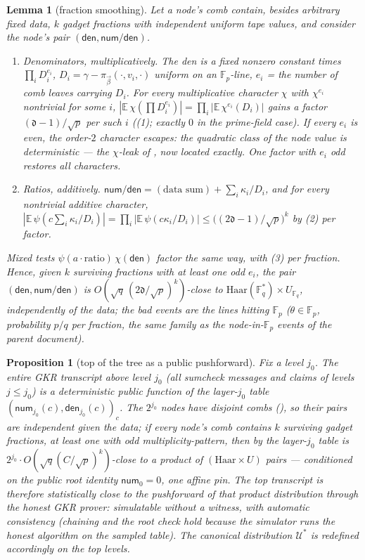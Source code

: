 \documentclass{article}
\newcommand{\Fp}{\mathbb{F}_p}
\newcommand{\Fq}{\mathbb{F}_q}
\newcommand{\extdeg}{\mathfrak{d}}
\newcommand{\num}{\mathsf{num}}
\newcommand{\den}{\mathsf{den}}
\newtheorem{lemma}[theorem]{Lemma}
\newtheorem{proposition}[theorem]{Proposition}
\theoremstyle{definition}
\begin{document}
\begin{lemma}[fraction smoothing]\label{lem:mult}
Let a node's comb contain, besides arbitrary fixed data, $k$ gadget fractions with independent uniform tape values, and consider the node's pair $(\den, \num/\den)$.
\begin{enumerate}
    \item \emph{Denominators, multiplicatively.} The den is a fixed nonzero constant times $\prod_i D_i^{e_i}$, $D_i = \gamma - \pi_{\vec\beta}(\cdot, v_i, \cdot)$ uniform on an $\Fp$-line, $e_i$ = the number of comb leaves carrying $D_i$. For every multiplicative character $\chi$ with $\chi^{e_i}$ nontrivial for some $i$, $|\mathbb{E}\,\chi(\prod D_i^{e_i})| = \prod_i |\mathbb{E}\,\chi^{e_i}(D_i)|$ gains a factor $(\extdeg-1)/\sqrt p$ per such $i$ ((1); exactly $0$ in the prime-field case). If \emph{every} $e_i$ is even, the order-$2$ character escapes: the quadratic class of the node value is deterministic --- the $\chi$-leak of , now located exactly. One factor with $e_i$ odd restores all characters.
    \item \emph{Ratios, additively.} $\num/\den = (\text{data sum}) + \sum_i \kappa_i / D_i$, and for every nontrivial additive character, $|\mathbb{E}\, \psi(c \sum_i \kappa_i/D_i)| = \prod_i |\mathbb{E}\,\psi(c\kappa_i/D_i)| \leq \big((2\extdeg-1)/\sqrt{p}\big)^{k}$ by (2) per factor.
\end{enumerate}
Mixed tests $\psi(a \cdot \mathrm{ratio})\,\chi(\den)$ factor the same way, with (3) per fraction. Hence, given $k$ surviving fractions with at least one odd $e_i$, the pair $(\den, \num/\den)$ is $O(\sqrt{q}\,(2\extdeg/\sqrt{p})^{k})$-close to $\mathrm{Haar}(\Fq^*) \times U_{\Fq}$, independently of the data; the bad events are the lines hitting $\Fp$ ($\theta \in \Fp$, probability $p/q$ per fraction, the same family as the node-in-$\Fp$ events of the parent document).
\end{lemma}

\begin{proposition}[top of the tree as a public pushforward]\label{prop:gkr-top}
Fix a level $j_0$. The entire GKR transcript above level $j_0$ (all sumcheck messages and claims of levels $j \leq j_0$) is a deterministic public function of the layer-$j_0$ table $(\num_{j_0}(c), \den_{j_0}(c))_{c}$. The $2^{j_0}$ nodes have \emph{disjoint} combs (), so their pairs are independent given the data; if every node's comb contains $k$ surviving gadget fractions, at least one with odd multiplicity-pattern, then by  the layer-$j_0$ table is $2^{j_0} \cdot O(\sqrt{q}(C/\sqrt p)^k)$-close to a product of $(\mathrm{Haar} \times U)$ pairs --- conditioned on the public root identity $\num_0 = 0$, one affine pin. The top transcript is therefore statistically close to the pushforward of that product distribution through the honest GKR prover: \emph{simulatable without a witness, with automatic consistency} (chaining and the root check hold because the simulator runs the honest algorithm on the sampled table). The canonical distribution $\mathcal{U}^*$ is redefined accordingly on the top levels.
\end{proposition}
\end{document}
